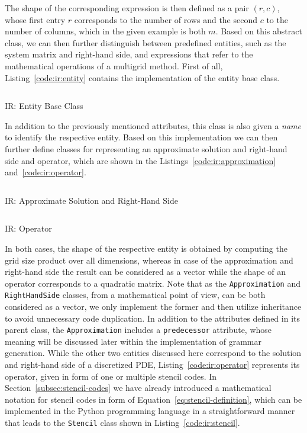 The shape of the corresponding expression is then defined as a pair $(r, c)$, whose first entry $r$ corresponds to the number of rows and the second $c$ to the number of columns, which in the given example is both $m$.
Based on this abstract class, we can then further distinguish between predefined entities, such as the system matrix and right-hand side, and expressions that refer to the mathematical operations of a multigrid method.
First of all, Listing~\ref{code:ir:entity} contains the implementation of the entity base class.
\begin{listing}
	\inputminted{python}{evostencils/ir/entity.py}
	\caption{IR: Entity Base Class}
	\label{code:ir:entity}
\end{listing}
In addition to the previously mentioned attributes, this class is also given a \emph{name} to identify the respective entity.
Based on this implementation we can then further define classes for representing an approximate solution and right-hand side and operator, which are shown in the Listings~\ref{code:ir:approximation} and~\ref{code:ir:operator}.
\begin{listing}
	\inputminted{python}{evostencils/ir/approximation.py}
	\caption{IR: Approximate Solution and Right-Hand Side}
	\label{code:ir:approximation}
\end{listing}
\begin{listing}
	\inputminted{python}{evostencils/ir/operator.py}
	\caption{IR: Operator}
	\label{code:ir:operator}
\end{listing}
In both cases, the shape of the respective entity is obtained by computing the grid size product over all dimensions, whereas in case of the approximation and right-hand side the result can be considered as a vector while the shape of an operator corresponds to a quadratic matrix.
Note that as the \texttt{Approximation} and \texttt{RightHandSide} classes, from a mathematical point of view, can be both considered as a vector, we only implement the former and then utilize inheritance to avoid unnecessary code duplication.
In addition to the attributes defined in its parent class, the \texttt{Approximation} includes a \texttt{predecessor} attribute, whose meaning will be discussed later within the implementation of grammar generation.
While the other two entities discussed here correspond to the solution and right-hand side of a discretized PDE, Listing~\ref{code:ir:operator} represents its operator, given in form of one or multiple stencil codes.
In Section~\ref{subsec:stencil-codes} we have already introduced a mathematical notation for stencil codes in form of Equation~\ref{eq:stencil-definition}, which can be implemented in the Python programming language in a straightforward manner that leads to the \texttt{Stencil} class shown in Listing~\ref{code:ir:stencil}.
